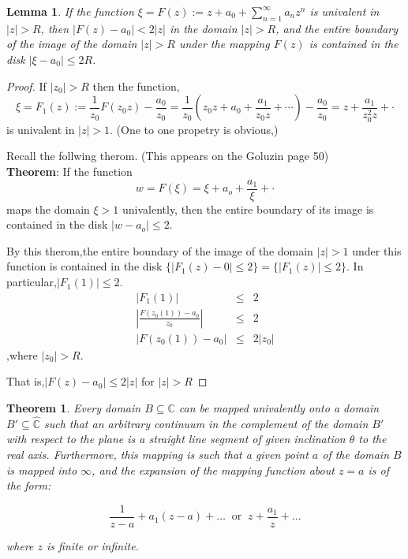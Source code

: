 \documentclass[
]{book}
\newtheorem{theorem}{Theorem}[chapter]
\newtheorem{lemma}{Lemma}[chapter]
\theoremstyle{definition}
\theoremstyle{definition}
\theoremstyle{definition}
\theoremstyle{definition}
\theoremstyle{remark}
\begin{document}
\begin{lemma}
\protect\hypertarget{lem:unnamed-chunk-16}{}\label{lem:unnamed-chunk-16}If the function
\(\xi=F(z) := z + a_0 + \sum_{n=1}^{\infty} a_n z^n\)
is univalent in \(|z| > R\), then \(|F(z) - a_0| < 2|z|\) in the domain \(|z| > R\), and the entire boundary of the image of the domain \(|z| > R\) under the mapping \(F(z)\) is contained in the disk \(|\xi-a_0| \leq 2R\).
\end{lemma}

\begin{proof}
If \(|z_0|>R\) then the function,
\[\xi=F_1(z):=\frac{1}{z_0}F(z_0z)-\frac{a_0}{z_0}=\frac{1}{z_0}\left( z_0z+ a_0+ \frac{a_1}{z_0z}+\cdots\right)-\frac{a_0}{z_0}=z+\frac{a_1}{z_0^2z}+\cdot\]
is univalent in \(|z|>1\). (One to one propetry is obvious,)

Recall the follwing therom. (This appears on the Goluzin page 50)\\
\textbf{Theorem}: If the function
\[w=F(\xi)=\xi+a_o+ \frac{a_1}{\xi} +\cdot\]
maps the domain \(\xi > 1\) univalently, then the
entire boundary of its image is contained in the disk \(|w - a_o |\leq 2\).

By this therom,the entire boundary of the image of the domain \(|z| > 1\) under this function is contained in the disk \(\{|F_1(z)-0|\leq 2\}=\{|F_1(z)|\leq 2\}\). In particular,\(|F_1(1)|\leq 2\).
\begin{eqnarray*}
|F_1(1) |&\leq & 2\\
|\frac{F(z_0(1))-a_0}{z_0}| &\leq & 2\\
|F(z_0(1))-a_0| &\leq & 2|z_0|
\end{eqnarray*}
,where \(|z_0|>R\).

That is,\(|F(z)-a_0|\leq 2|z|\) for \(|z|>R\)
\end{proof}

\begin{theorem}
\protect\hypertarget{thm:unnamed-chunk-18}{}\label{thm:unnamed-chunk-18}Every domain \(B\subseteq \mathbb{C}\) can be mapped univalently onto a domain \(B'\subseteq \hat{\mathbb{C}}\) such that an arbitrary continuum in the complement of the domain \(B'\) with respect to the plane is a straight line segment of given inclination \(\theta\) to the real axis. Furthermore, this mapping is such that a given point \(a\) of the domain \(B\) is mapped into \(\infty\), and the expansion of the mapping function about \(z = a\) is of the form:

\[ \frac{1}{z - a} + a_1(z- a) +\ldots ~\text{ or }~ z+\frac{a_1}{z}+\ldots\]

where \(z\) is finite or infinite.
\end{theorem}
\end{document}
